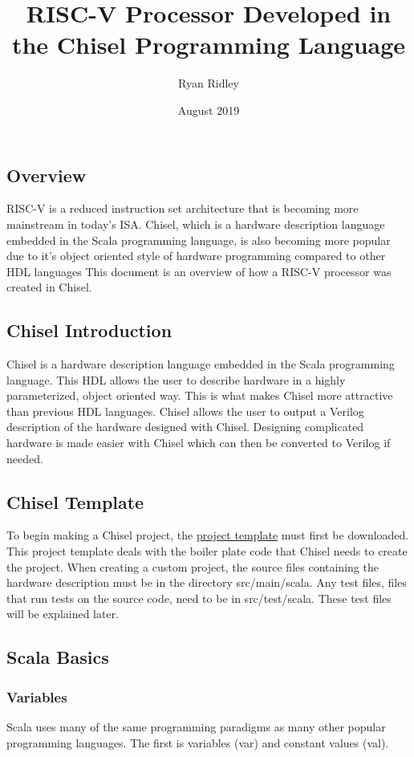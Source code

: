 \documentclass[12pt, letterpaper]{report}
\title{RISC-V Processor Developed in the Chisel Programming Language}
\author{Ryan Ridley}
\date{August 2019}
\begin{document}
\maketitle
\chapter{}
\section{Overview}
RISC-V is a reduced instruction set architecture that is becoming more mainstream in today's ISA. 
Chisel, which is a hardware description language embedded in the Scala programming language, is also becoming more popular due to it's object oriented style of hardware programming compared to other HDL languages 
This document is an overview of how a RISC-V processor was created in Chisel.
\section{Chisel Introduction}

Chisel is a hardware description language embedded in the Scala programming language. 
This HDL allows the user to describe hardware in a highly parameterized, object oriented way. 
This is what makes Chisel more attractive than previous HDL languages. 
Chisel allows the user to output a Verilog description of the hardware designed with Chisel.
Designing complicated hardware is made easier with Chisel which can then be converted to Verilog if needed.

\section{Chisel Template}
To begin making a Chisel project, the \href{https://github.com/freechipsproject/chisel-template}{project template} must first be downloaded. 
This project template deals with the boiler plate code that Chisel needs to create the project.
When creating a custom project, the source files containing the hardware description must be in the directory src/main/scala. 
Any test files, files that run tests on the source code, need to be in src/test/scala. 
These test files will be explained later.

\section{Scala Basics}
\subsection{Variables}
Scala uses many of the same programming paradigms as many other popular programming languages. The first is variables (var) and constant values (val). 
\end{document}
